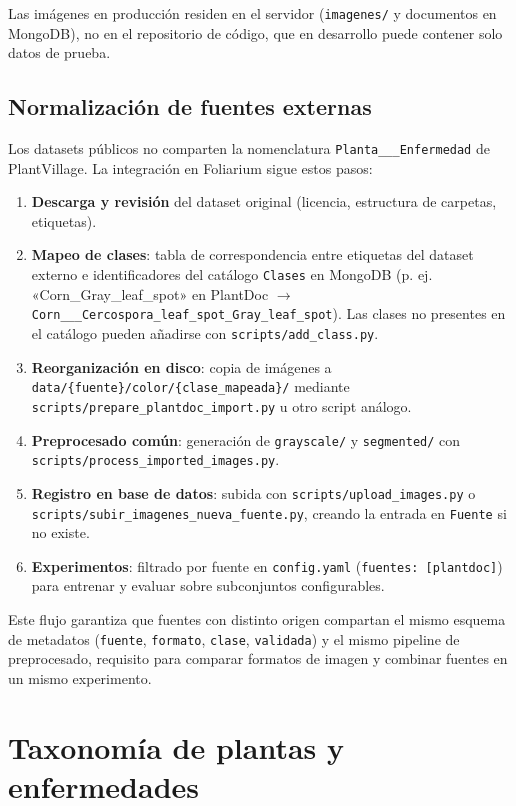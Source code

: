 \documentclass[11pt,spanish,listoffigures,listoftables]{tfgetsinf}
\begin{document}
Las imágenes en producción residen en el servidor (\texttt{imagenes/} y documentos en MongoDB), no en el repositorio de código, que en desarrollo puede contener solo datos de prueba.

\subsection{Normalización de fuentes externas}
\label{sec:normalizacion-fuentes}

Los datasets públicos no comparten la nomenclatura \texttt{Planta\_\_\_Enfermedad} de PlantVillage. La integración en Foliarium sigue estos pasos:

\begin{enumerate}
    \item \textbf{Descarga y revisión} del dataset original (licencia, estructura de carpetas, etiquetas).
    \item \textbf{Mapeo de clases}: tabla de correspondencia entre etiquetas del dataset externo e identificadores del catálogo \texttt{Clases} en MongoDB (p. ej. «Corn\_Gray\_leaf\_spot» en PlantDoc $\rightarrow$ \texttt{Corn\_\_\_Cercospora\_leaf\_spot\_Gray\_leaf\_spot}). Las clases no presentes en el catálogo pueden añadirse con \texttt{scripts/add\_class.py}.
    \item \textbf{Reorganización en disco}: copia de imágenes a \texttt{data/\{fuente\}/color/\{clase\_mapeada\}/} mediante \texttt{scripts/prepare\_plantdoc\_import.py} u otro script análogo.
    \item \textbf{Preprocesado común}: generación de \texttt{grayscale/} y \texttt{segmented/} con \texttt{scripts/process\_imported\_images.py}.
    \item \textbf{Registro en base de datos}: subida con \texttt{scripts/upload\_images.py} o \texttt{scripts/subir\_imagenes\_nueva\_fuente.py}, creando la entrada en \texttt{Fuente} si no existe.
    \item \textbf{Experimentos}: filtrado por fuente en \texttt{config.yaml} (\texttt{fuentes: [plantdoc]}) para entrenar y evaluar sobre subconjuntos configurables.
\end{enumerate}

Este flujo garantiza que fuentes con distinto origen compartan el mismo esquema de metadatos (\texttt{fuente}, \texttt{formato}, \texttt{clase}, \texttt{validada}) y el mismo pipeline de preprocesado, requisito para comparar formatos de imagen y combinar fuentes en un mismo experimento.

\section{Taxonomía de plantas y enfermedades}
\end{document}
